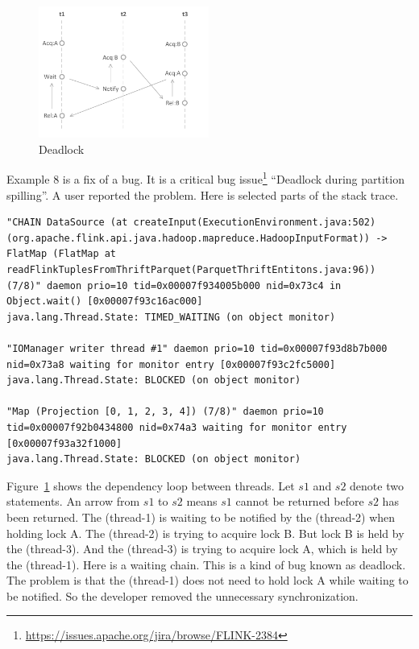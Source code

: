 \begin{figure}
	\centering
	\includegraphics[height=1.7in]{deadlock}
	\caption{Deadlock}
	\label{figure:deadlock}
\end{figure}



Example 8 is a fix of a bug. It is a critical bug issue\footnote{\url{https://issues.apache.org/jira/browse/FLINK-2384}} ``Deadlock during partition spilling''. A user reported the problem. Here is selected parts of the stack trace.

\begin{lstlisting}
"CHAIN DataSource (at createInput(ExecutionEnvironment.java:502) (org.apache.flink.api.java.hadoop.mapreduce.HadoopInputFormat)) -> FlatMap (FlatMap at readFlinkTuplesFromThriftParquet(ParquetThriftEntitons.java:96)) (7/8)" daemon prio=10 tid=0x00007f934005b000 nid=0x73c4 in Object.wait() [0x00007f93c16ac000]
java.lang.Thread.State: TIMED_WAITING (on object monitor)

"IOManager writer thread #1" daemon prio=10 tid=0x00007f93d8b7b000 nid=0x73a8 waiting for monitor entry [0x00007f93c2fc5000]
java.lang.Thread.State: BLOCKED (on object monitor)

"Map (Projection [0, 1, 2, 3, 4]) (7/8)" daemon prio=10 tid=0x00007f92b0434800 nid=0x74a3 waiting for monitor entry [0x00007f93a32f1000]
java.lang.Thread.State: BLOCKED (on object monitor)
\end{lstlisting}

Figure~\ref{figure:deadlock} shows the dependency loop between threads. Let $s1$ and $s2$ denote two statements. An arrow from $s1$ to $s2$ means $s1$ cannot be returned before $s2$ has been returned. The  (thread-1) is waiting to be notified by the  (thread-2) when holding lock A. The  (thread-2) is trying to acquire lock B. But lock B is held by the  (thread-3). And the  (thread-3) is trying to acquire lock A, which is held by the  (thread-1). Here is a waiting chain. This is a kind of bug known as deadlock. The problem is that the  (thread-1) does not need to hold lock A while waiting to be notified. So the developer removed the unnecessary synchronization.

